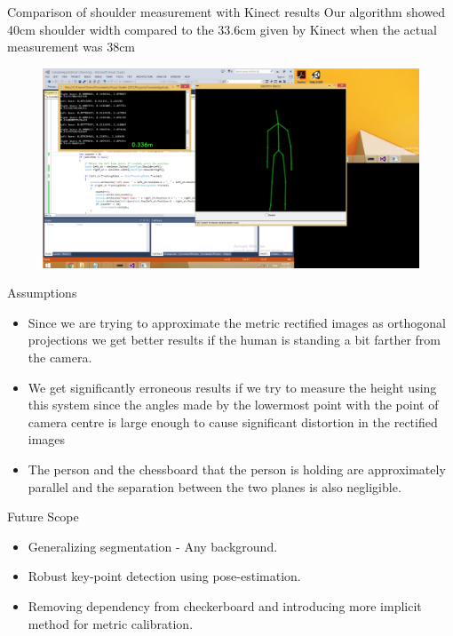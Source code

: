 \documentclass{beamer}
\begin{document}
\begin{frame}{Comparison of shoulder measurement with Kinect results}
Our algorithm showed 40cm shoulder width compared to the 33.6cm given by Kinect when the actual measurement was 38cm
\begin{figure}[h]
    \includegraphics[width=\textwidth]{kinect.png}
\end{figure}
\end{frame}




\begin{frame}{Assumptions}
\begin{itemize}
    \item Since we are trying to approximate the metric rectified images as orthogonal projections we get better results if the human is standing a bit farther from the camera.
    \item We get significantly erroneous results if we try to measure the height using this system since the angles made by the lowermost point with the point of camera centre is large enough to cause significant distortion in the rectified images
    \item The person and the chessboard that the person is holding are approximately parallel and the separation between the two planes is also negligible.
\end{itemize}
\end{frame}



\begin{frame}{Future Scope}
\begin{itemize}
\item Generalizing segmentation - Any background.
\bigskip
\item Robust key-point detection using pose-estimation.
\bigskip
\item Removing dependency from checkerboard and introducing more implicit method for metric calibration.
\end{itemize}
\end{frame}
\end{document}
